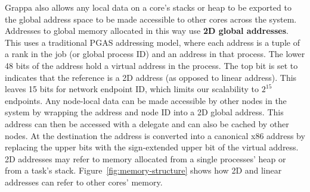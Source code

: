 Grappa also allows any local data on a core's stacks or heap to be
exported to the global address space to be made accessible to other
cores across the system. Addresses to global memory allocated in this
way use \textbf{2D global addresses}.  This uses a traditional PGAS
addressing model, where each address is a tuple of a rank in the job (or
global process ID) and an address in that process. The lower 48 bits of
the address hold a virtual address in the process. The top bit is set to
indicates that the reference is a 2D address (as opposed to linear
address). This leaves 15 bits for network endpoint ID, which limits our
scalability to $2^{15}$ endpoints. Any node-local data can be made
accessible by other nodes in the system by wrapping the address and node
ID into a 2D global address. This address can then be accessed with a
delegate and can also be cached by other nodes. At the destination the
address is converted into a canonical x86 address by replacing the upper
bits with the sign-extended upper bit of the virtual address. 2D
addresses may refer to memory allocated from a single processes' heap or
from a task's stack. Figure~\ref{fig:memory-structure} shows how 2D and
linear addresses can refer to other cores' memory.


